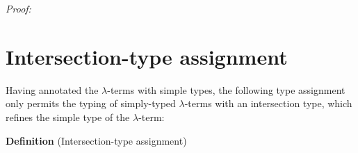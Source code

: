 \documentclass[a4paper, 12pt, twoside]{style/ociamthesis}
\newcommand{\concat}{\ensuremath{+\!\!\!\!+\,}}
\newcommand{\tocap}{\leadsto\kern-.5ex\cap}
\begin{document}
\emph{Proof:}


\section{Intersection-type
assignment}\label{intersection-type-assignment}

Having annotated the \(\lambda\)-terms with simple types, the following
type assignment only permits the typing of simply-typed
\(\lambda\)-terms with an intersection type, which refines the simple
type of the \(\lambda\)-term:

\textbf{Definition} (Intersection-type assignment)
\end{document}

